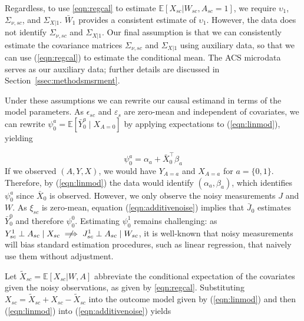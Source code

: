 \documentclass[aoas]{imsart}
\theoremstyle{plain}
\theoremstyle{remark}
\begin{document}
Regardless, to use \eqref{eqn:regcal} to estimate $\mathbb{E}[X_{sc}|W_{sc}, A_{sc}=1]$, we require $\upsilon_1$, $\Sigma_{\nu,sc}$, and $\Sigma_{X|1}$. $\bar{W}_1$ provides a consistent estimate of $\upsilon_1$. However, the data does not identify $\Sigma_{\nu,sc}$ and $\Sigma_{X|1}$. Our final assumption is that we can consistently estimate the covariance matrices $\Sigma_{\nu,sc}$ and $\Sigma_{X|1}$ using auxiliary data, so that we can use (\ref{eqn:regcal}) to estimate the conditional mean. The ACS microdata serves as our auxiliary data; further details are discussed in Section~\ref{ssec:methodsmsrment}.

Under these assumptions we can rewrite our causal estimand in terms of the model parameters. As $\epsilon_{sc}$ and $\varepsilon_s$ are zero-mean and independent of covariates,  we can rewrite $\psi_0^a = \mathbb{E}[\bar{Y}_0^a \mid X_{A=0}]$ by applying expectations to (\ref{eqn:linmod}), yielding

\begin{equation}\label{eqn:outcome}
\psi_0^a = \alpha_a + \bar{X}_0^\top\beta_a
\end{equation}
If we observed $(A,Y,X)$, we would have $Y_{A=a}$ and $X_{A=a}$ for $a=\{0,1\}$. Therefore, by (\ref{eqn:linmod}) the data would identify $(\alpha_a, \beta_a)$, which identifies $\psi_0^a$ since $\bar{X}_0$ is observed. However, we only observe the noisy measurements $J$ and $W$. As $\xi_{sc}$ is zero-mean, equation (\ref{eqn:additivenoise}) implies that $\bar{J}_0$ estimates $\bar{Y}_0^0$ and therefore $\psi_0^0$. Estimating $\psi_0^1$ remains challenging: as $Y_{sc}^1 \perp A_{sc} \mid X_{sc} \centernot\implies J_{sc}^1 \perp A_{sc} \mid W_{sc}$, it is well-known that noisy measurements will bias standard estimation procedures, such as linear regression, that naively use them without adjustment.

Let $\tilde{X}_{sc} = \mathbb{E}[X_{sc} |W, A]$ abbreviate the conditional expectation of the covariates given the noisy observations, as given by \eqref{eqn:regcal}. Substituting $X_{sc} = \tilde{X}_{sc} + X_{sc} - \tilde{X}_{sc}$ into the outcome model given by (\ref{eqn:linmod}) and then (\ref{eqn:linmod}) into (\ref{eqn:additivenoise}) yields
\end{document}
